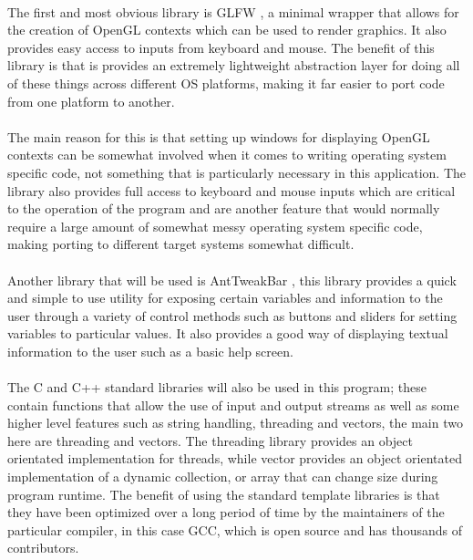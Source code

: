 \paragraph{}
The first and most obvious library is GLFW \cite{glfw}, a minimal wrapper that allows for the creation of OpenGL contexts which can be used to render graphics. It also provides easy access to inputs from keyboard and mouse. The benefit of this library is that is provides an extremely lightweight abstraction layer for doing all of these things across different OS platforms, making it far easier to port code from one platform to another.

\paragraph{}
The main reason for this is that setting up windows for displaying OpenGL contexts can be somewhat involved when it comes to writing operating system specific code, not something that is particularly necessary in this application. The library also provides full access to keyboard and mouse inputs which are critical to the operation of the program and are another feature that would normally require a large amount of somewhat messy operating system specific code, making porting to different target systems somewhat difficult.

\paragraph{}
Another library that will be used is AntTweakBar \cite{atb}, this library provides a quick and simple to use utility for exposing certain variables and information to the user through a variety of control methods such as buttons and sliders for setting variables to particular values. It also provides a good way of displaying textual information to the user such as a basic help screen.

\paragraph{}
The C and C++ standard libraries will also be used in this program; these contain functions that allow the use of input and output streams as well as some higher level features such as string handling, threading and vectors, the main two here are threading and vectors. The threading library provides an object orientated implementation for threads, while vector provides an object orientated implementation of a dynamic collection, or array that can change size during program runtime. The benefit of using the standard template libraries is that they have been optimized over a long period of time by the maintainers of the particular compiler, in this case GCC, which is open source and has thousands of contributors.

